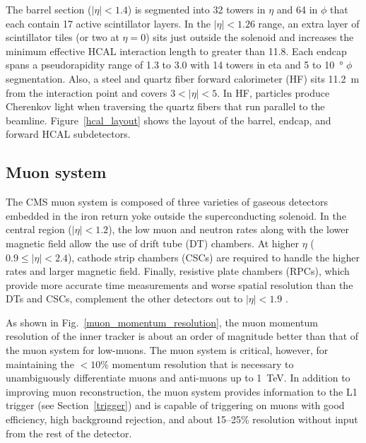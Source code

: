 The barrel section ($|\eta|<1.4$) is segmented into \num{32} towers in $\eta$ and \num{64} in $\phi$ that each contain 17 active scintillator layers. In the $|\eta|<1.26$ range, an extra layer of scintillator tiles (or two at $\eta=0$) sits just outside the solenoid and increases the minimum effective HCAL interaction length to greater than \num{11.8}. Each endcap spans a pseudorapidity range of \num{1.3} to \num{3.0} with \num{14} towers in eta and \num{5} to \SI{10}{\degree} $\phi$ segmentation. Also, a steel and quartz fiber forward calorimeter (HF) sits \SI{11.2}{m} from the interaction point and covers $3<|\eta|<5$. In HF, particles produce Cherenkov light when traversing the quartz fibers that run parallel to the beamline. Figure~\ref{hcal_layout} shows the layout of the barrel, endcap, and forward HCAL subdetectors.



\subsection{Muon system}
The CMS muon system is composed of three varieties of gaseous detectors embedded in the iron return yoke outside the superconducting solenoid. In the central region ($|\eta|<1.2$), the low muon and neutron rates along with the lower magnetic field allow the use of drift tube (DT) chambers. At higher $\eta$ ($0.9\leq|\eta|<2.4$), cathode strip chambers (CSCs) are required to handle the higher rates and larger magnetic field. Finally, resistive plate chambers (RPCs), which provide more accurate time measurements and worse spatial resolution than the DTs and CSCs, complement the other detectors out to $|\eta|<1.9$ \cite{cms_tdr_v1, cms_ms_performance}.

As shown in Fig.~\ref{muon_momentum_resolution}, the muon momentum resolution of the inner tracker is about an order of magnitude better than that of the muon system for low-\pt muons. The muon system is critical, however, for maintaining the $<10\%$ momentum resolution that is necessary to unambiguously differentiate muons and anti-muons up to \SI{1}{\TeV}. In addition to improving muon reconstruction, the muon system provides information to the L1 trigger (see Section~\ref{trigger}) and is capable of triggering on muons with good efficiency, high background rejection, and about 15--25\% \pt resolution without input from the rest of the detector.

